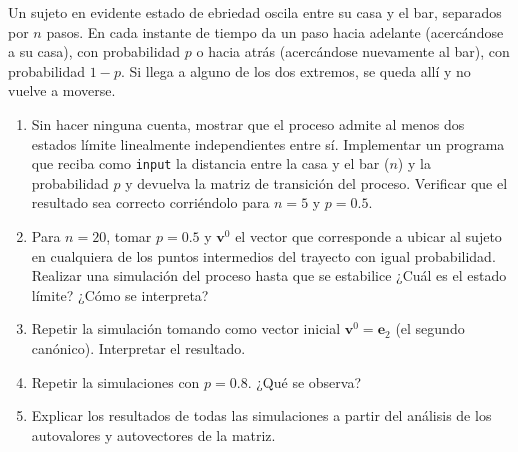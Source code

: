 \begin{enunciado}{\ejercicio}
  Un sujeto en evidente estado de ebriedad oscila entre su casa y el bar, separados
  por $n$ pasos. En cada instante de tiempo da un paso hacia adelante (acercándose a su casa),
  con probabilidad $p$ o hacia atrás (acercándose nuevamente al bar), con probabilidad $1 - p$.
  Si llega a alguno de los dos extremos, se queda allí y no vuelve a moverse.

  \begin{enumerate}[label=(\alph*)]
    \item Sin hacer ninguna cuenta, mostrar que el proceso admite al menos dos estados límite
          linealmente independientes entre sí. Implementar un programa que reciba como \texttt{input} la
          distancia entre la casa y el bar ($n$) y la probabilidad $p$ y devuelva la matriz de transición
          del proceso. Verificar que el resultado sea correcto corriéndolo para $n = 5$ y $p = 0.5$.

    \item Para $n = 20$, tomar $p = 0.5$ y $\bm{v}^0$ el vector que corresponde a ubicar al sujeto
          en cualquiera de los puntos intermedios del trayecto con igual probabilidad. Realizar una
          simulación del proceso hasta que se estabilice ¿Cuál es el estado límite? ¿Cómo se interpreta?

    \item Repetir la simulación tomando como vector inicial $\bm{v}^0 = \bm{e}_2$ (el segundo canónico).
          Interpretar el resultado.

    \item Repetir la simulaciones con $p = 0.8$. ¿Qué se observa?

    \item Explicar los resultados de todas las simulaciones a partir del análisis de los autovalores y autovectores de la matriz.
  \end{enumerate}
\end{enunciado}

